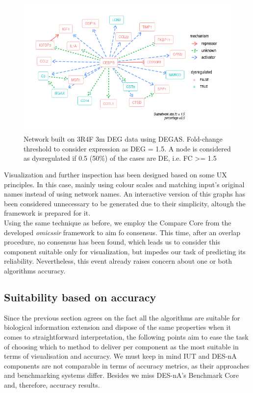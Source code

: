 \begin{figure}
    \centering
    \includegraphics[width=\textwidth]{Major Thesis/figures/desna/desna-network.png}
    \caption{Network built on 3R4F 3m DEG data using DEGAS. Fold-change threshold to consider expression as DEG = 1.5. A node is considered as dysregulated if 0.5 (50\%) of the cases are DE, i.e. FC >= 1.5}
    \label{fig:desna-network}
\end{figure}

Visualization and further inspection has been designed based on some UX principles. In this case, mainly using colour scales and matching input’s original names instead of using network names. An interactive version of this graphs has been considered unnecessary to be generated due to their simplicity, altough the framework is prepared for it.
\\

Using the same technique as before, we employ the Compare Core from the developed \textit{omicssir} framework to aim fo consensus. This time, after an overlap procedure, no consensus has been found, which leads us to consider this component suitable only for visualization, but impedes our task of predicting its reliability. Nevertheless, this event already raises concern about one or both algorithms accuracy.

\subsection{Suitability based on accuracy}
Since the previous section agrees on the fact all the algorithms are suitable for biological information extension and dispose of the same properties when it comes to straightforward interpretation, the following points aim to ease the task of choosing which to method to deliver per component as the most suitable in terms of visualisation and accuracy.
We must keep in mind IUT and DES-nA components are not comparable in terms of accuracy metrics, as their approaches and benchmarking systems differ. Besides we miss DES-nA’s Benchmark Core and, therefore, accuracy results.

